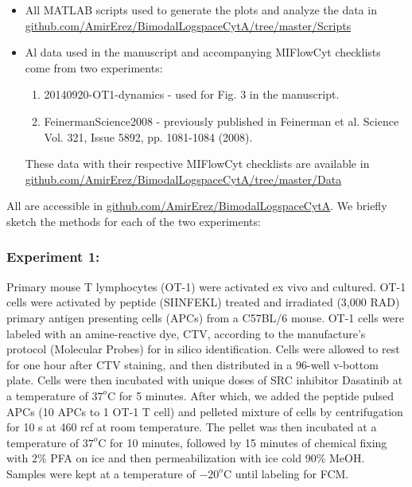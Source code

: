 \documentclass[11pt,a4paper,draft]{article}
\begin{document}
\smallskip
\begin{itemize}
\item All MATLAB scripts used to generate the plots and analyze the data in {\small \href{https://github.com/AmirErez/BimodalLogspaceCytA/tree/master/Scripts}{github.com/AmirErez/BimodalLogspaceCytA/tree/master/Scripts}}
\item Al data used in the manuscript and accompanying MIFlowCyt checklists come from two experiments:
	\begin{enumerate}
	\item 20140920-OT1-dynamics - used for Fig. 3 in the manuscript.
	\item FeinermanScience2008 - previously published in Feinerman et al. Science Vol. 321, Issue 5892, pp. 1081-1084 (2008). 
	\end{enumerate}
These data with their respective MIFlowCyt checklists are available in {\small
\href{https://github.com/AmirErez/BimodalLogspaceCytA/tree/master/Data}{github.com/AmirErez/BimodalLogspaceCytA/tree/master/Data}}
\end{itemize} 
All are accessible in {\small\href{https://github.com/AmirErez/BimodalLogspaceCytA}{github.com/AmirErez/BimodalLogspaceCytA}}.
We briefly sketch the methods for each of the two experiments:
\subsubsection*{Experiment 1:} Primary mouse T lymphocytes (OT-1) were activated ex vivo and cultured. OT-1 cells were activated by peptide (SIINFEKL) treated and irradiated (3,000 RAD) primary antigen presenting cells (APCs) from a C57BL/6 mouse. OT-1 cells were labeled with an amine-reactive dye, CTV, according to the manufacture’s protocol (Molecular Probes) for in silico identification. Cells were allowed to rest for one hour after CTV staining, and then distributed in a 96-well v-bottom plate. Cells were then incubated with unique doses of SRC inhibitor Dasatinib at a temperature of $37^o$C for 5 minutes. After which,  we added the peptide pulsed APCs (10 APCs to 1 OT-1 T cell) and pelleted mixture of cells by centrifugation for 10 s at 460 rcf at room temperature.  The pellet was then incubated at a temperature of $37^o$C for 10 minutes, followed by 15 minutes of chemical fixing with 2\% PFA on ice and then permeabilization with ice cold 90\% MeOH. Samples were kept at a temperature of $-20^o$C until labeling for FCM.
\end{document}
